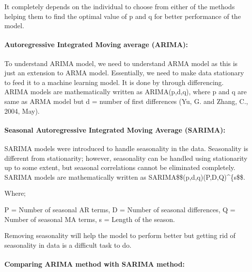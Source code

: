 \documentclass[
  letterpaper,
  DIV=11,
  numbers=noendperiod]{scrartcl}
\let\oldparagraph\paragraph
\renewcommand{\paragraph}[1]{\oldparagraph{#1}\mbox{}}
\begin{document}
It completely depends on the individual to choose from either of the
methods helping them to find the optimal value of p and q for better
performance of the model.

\hypertarget{autoregressive-integrated-moving-average-arima}{%
\paragraph{\texorpdfstring{\textbf{Autoregressive Integrated Moving
average
(ARIMA):}}{Autoregressive Integrated Moving average (ARIMA):}}\label{autoregressive-integrated-moving-average-arima}}

To understand ARIMA model, we need to understand ARMA model as this is
just an extension to ARMA model. Essentially, we need to make data
stationary to feed it to a machine learning model. It is done by through
differencing. ARIMA models are mathematically written as ARIMA(p,d,q),
where p and q are same as ARMA model but d = number of first differences
(Yu, G. and Zhang, C., 2004, May).

\hypertarget{seasonal-autoregressive-integrated-moving-average-sarima}{%
\paragraph{\texorpdfstring{\textbf{Seasonal Autoregressive Integrated
Moving Average
(SARIMA):}}{Seasonal Autoregressive Integrated Moving Average (SARIMA):}}\label{seasonal-autoregressive-integrated-moving-average-sarima}}

SARIMA models were introduced to handle seasonality in the data.
Seasonality is different from stationarity; however, seasonality can be
handled using stationarity up to some extent, but seasonal correlations
cannot be eliminated completely. SARIMA models are mathematically
written as SARIMA\$\$(p,d,q)(P,D,Q)\^{}\{s\$\$.

Where;

P = Number of seasonal AR terms, D = Number of seasonal differences, Q =
Number of seasonal MA terms, s = Length of the season.

Removing seasonality will help the model to perform better but getting
rid of seasonality in data is a difficult task to do.

\hypertarget{comparing-arima-method-with-sarima-method}{%
\paragraph{\texorpdfstring{\textbf{Comparing ARIMA method with SARIMA
method:}}{Comparing ARIMA method with SARIMA method:}}\label{comparing-arima-method-with-sarima-method}}
\end{document}
